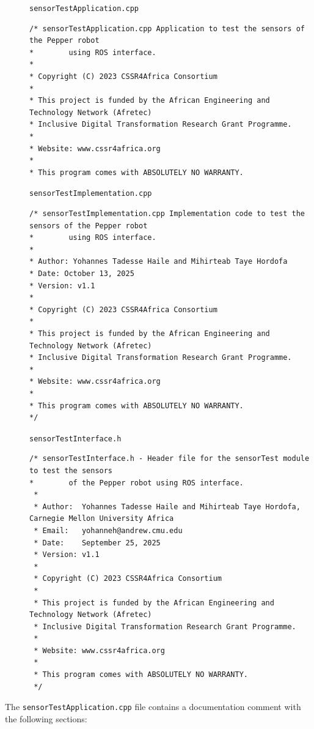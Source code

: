 \documentclass{CSSRforAfrica}
\newcommand{\checkboxChecked}{\fbox{\ding{51}}} %
\begin{document}
\begin{description}

\item[\checkboxChecked] {\small \verb+sensorTestApplication.cpp+}
{\scriptsize \begin{verbatim}
/* sensorTestApplication.cpp Application to test the sensors of the Pepper robot
*        using ROS interface.   
*
* Copyright (C) 2023 CSSR4Africa Consortium
*
* This project is funded by the African Engineering and Technology Network (Afretec)
* Inclusive Digital Transformation Research Grant Programme.
*
* Website: www.cssr4africa.org
*
* This program comes with ABSOLUTELY NO WARRANTY.
\end{verbatim} }

\item[\checkboxChecked] {\small \verb+sensorTestImplementation.cpp+}
{\scriptsize \begin{verbatim}
/* sensorTestImplementation.cpp Implementation code to test the sensors of the Pepper robot 
*        using ROS interface.
*
* Author: Yohannes Tadesse Haile and Mihirteab Taye Hordofa
* Date: October 13, 2025
* Version: v1.1
*
* Copyright (C) 2023 CSSR4Africa Consortium
*
* This project is funded by the African Engineering and Technology Network (Afretec)
* Inclusive Digital Transformation Research Grant Programme.
*
* Website: www.cssr4africa.org
*
* This program comes with ABSOLUTELY NO WARRANTY.
*/
\end{verbatim} }

\item[\checkboxChecked] {\small \verb+sensorTestInterface.h+}
{\scriptsize \begin{verbatim}
/* sensorTestInterface.h - Header file for the sensorTest module to test the sensors
*        of the Pepper robot using ROS interface.
 *
 * Author:  Yohannes Tadesse Haile and Mihirteab Taye Hordofa, Carnegie Mellon University Africa
 * Email:   yohanneh@andrew.cmu.edu
 * Date:    September 25, 2025
 * Version: v1.1
 *
 * Copyright (C) 2023 CSSR4Africa Consortium
 *
 * This project is funded by the African Engineering and Technology Network (Afretec)
 * Inclusive Digital Transformation Research Grant Programme.
 *
 * Website: www.cssr4africa.org
 *
 * This program comes with ABSOLUTELY NO WARRANTY.
 */
\end{verbatim} }

\end{description}

\noindent The {\small \verb+sensorTestApplication.cpp+} file contains a documentation comment with the following sections:
\end{document}
